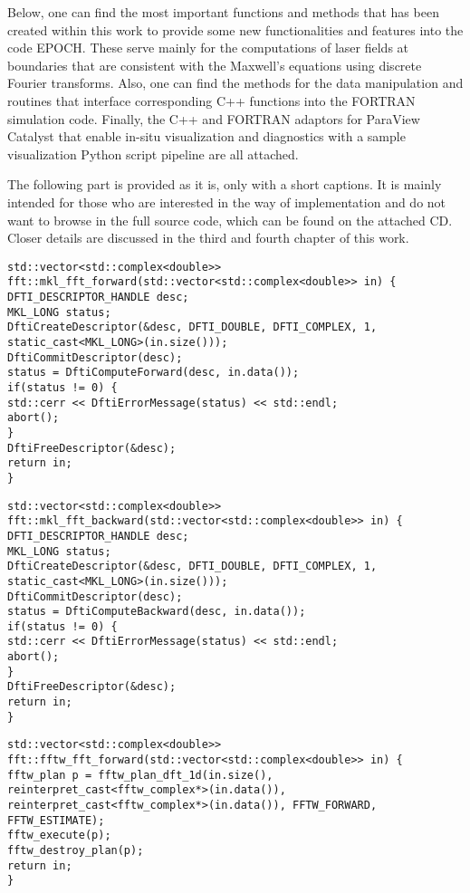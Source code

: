 Below, one can find the most important functions and methods that has been created within this work to provide some new functionalities and features into the code EPOCH. These serve mainly for the computations of laser fields at boundaries that are consistent with the Maxwell's equations using discrete Fourier transforms. Also, one can find the methods for the data manipulation and routines that interface corresponding C++ functions into the FORTRAN simulation code. Finally, the C++ and FORTRAN adaptors for ParaView Catalyst that enable in-situ visualization and diagnostics with a sample visualization Python script pipeline are all attached.

The following part is provided as it is, only with a short captions. It is mainly intended for those who are interested in the way of implementation and do not want to browse in the full source code, which can be found on the attached CD. Closer details are discussed in the third and fourth chapter of this work.

\begin{lstlisting}[style=CXX, caption=Function performing forward fast Fourier transform using MKL library]
std::vector<std::complex<double>> fft::mkl_fft_forward(std::vector<std::complex<double>> in) {
DFTI_DESCRIPTOR_HANDLE desc;
MKL_LONG status;
DftiCreateDescriptor(&desc, DFTI_DOUBLE, DFTI_COMPLEX, 1, static_cast<MKL_LONG>(in.size()));
DftiCommitDescriptor(desc);
status = DftiComputeForward(desc, in.data());
if(status != 0) {
std::cerr << DftiErrorMessage(status) << std::endl;
abort();
}
DftiFreeDescriptor(&desc);
return in;
}
\end{lstlisting}

\begin{lstlisting}[style=CXX, caption=Function performing backward fast Fourier transform using MKL library]
std::vector<std::complex<double>> fft::mkl_fft_backward(std::vector<std::complex<double>> in) {
DFTI_DESCRIPTOR_HANDLE desc;
MKL_LONG status;
DftiCreateDescriptor(&desc, DFTI_DOUBLE, DFTI_COMPLEX, 1, static_cast<MKL_LONG>(in.size()));
DftiCommitDescriptor(desc);
status = DftiComputeBackward(desc, in.data());
if(status != 0) {
std::cerr << DftiErrorMessage(status) << std::endl;
abort();
}
DftiFreeDescriptor(&desc);
return in;
}
\end{lstlisting}

\begin{lstlisting}[style=CXX, caption=Function performing forward fast Fourier transform using FFTW library]
std::vector<std::complex<double>> fft::fftw_fft_forward(std::vector<std::complex<double>> in) {
fftw_plan p = fftw_plan_dft_1d(in.size(), reinterpret_cast<fftw_complex*>(in.data()), reinterpret_cast<fftw_complex*>(in.data()), FFTW_FORWARD, FFTW_ESTIMATE);
fftw_execute(p);
fftw_destroy_plan(p);
return in;
}
\end{lstlisting}

